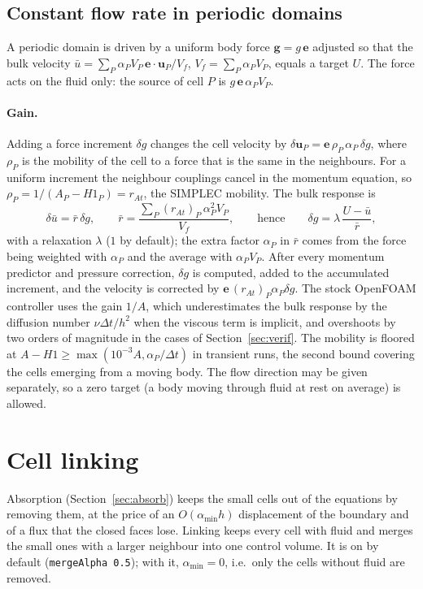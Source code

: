\documentclass[11pt,a4paper]{article}
\theoremstyle{remark}
\newcommand{\uu}{\bm{u}}
\newcommand{\dt}{\Delta t}
\newcommand{\code}[1]{\texttt{#1}}
\begin{document}
\subsection{Constant flow rate in periodic domains}
\label{sec:meanforce}

A periodic domain is driven by a uniform body force $\bm g=g\,\bm e$ adjusted so that the bulk
velocity $\bar u=\sum_P\alpha_PV_P\,\bm e\cdot\uu_P/V_f$, $V_f=\sum_P\alpha_PV_P$, equals a target
$U$. The force acts on the fluid only: the source of cell $P$ is $g\,\bm e\,\alpha_PV_P$.

\paragraph{Gain.} Adding a force increment $\delta g$ changes the cell velocity by
$\delta\uu_P=\bm e\,\rho_P\,\alpha_P\,\delta g$, where $\rho_P$ is the mobility of the cell to a
force that is the same in the neighbours. For a uniform increment the neighbour couplings
cancel in the momentum equation, so $\rho_P=1/(A_P-H1_P)=r_{At}$, the SIMPLEC mobility. The
bulk response is
\begin{equation}
\delta\bar u=\bar r\,\delta g,\qquad \bar r=\frac{\sum_P(r_{At})_P\,\alpha_P^2V_P}{V_f},
\qquad\text{hence}\qquad
\delta g=\lambda\,\frac{U-\bar u}{\bar r},
\label{eq:gain}
\end{equation}
with a relaxation $\lambda$ ($1$ by default); the extra factor $\alpha_P$ in $\bar r$ comes from
the force being weighted with $\alpha_P$ and the average with $\alpha_PV_P$. After every
momentum predictor and pressure correction, $\delta g$ is computed, added to the accumulated
increment, and the velocity is corrected by $\bm e\,(r_{At})_P\alpha_P\delta g$. The
stock OpenFOAM controller uses the gain $1/A$, which underestimates the bulk response by
the diffusion number $\nu\dt/h^2$ when the viscous term is implicit, and overshoots by two
orders of magnitude in the cases of Section~\ref{sec:verif}.
The mobility is floored at $A-H1\ge\max(10^{-3}A,\alpha_P/\dt)$ in transient runs, the second
bound covering the cells emerging from a moving body. The flow direction may be given
separately, so a zero target (a body moving through fluid at rest on average) is allowed.
\section{Cell linking}
\label{sec:linking}

Absorption (Section~\ref{sec:absorb}) keeps the small cells out of the equations by removing
them, at the price of an $O(\alpha_{\min}h)$ displacement of the boundary and of a flux that the
closed faces lose. Linking keeps every cell with fluid and merges the small ones with a larger
neighbour into one control volume. It is on by default (\code{mergeAlpha 0.5}); with it,
$\alpha_{\min}=0$, i.e.\ only the cells without fluid are removed.
\end{document}

